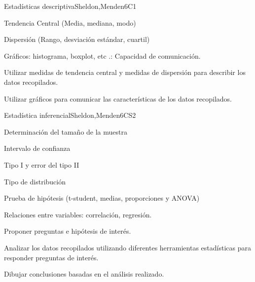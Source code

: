 \begin{syllabus}
\begin{unit}{Estadísticas descriptiva}{}{Sheldon,Menden}{6}{C1}
\begin{topics}
      \item Tendencia Central (Media, mediana, modo)
      \item Dispersión (Rango, desviación estándar, cuartil)
      \item Gráficos: histograma, boxplot, etc .: Capacidad de comunicación.
   \end{topics}
   \begin{learningoutcomes}
      \item Utilizar medidas de tendencia central y medidas de dispersión para describir los datos recopilados.
      \item Utilizar gráficos para comunicar las características de los datos recopilados.
   \end{learningoutcomes}
\end{unit}

\begin{unit}{Estadística inferencial}{}{Sheldon,Menden}{6}{CS2}
\begin{topics}
      \item Determinación del tamaño de la muestra
      \item Intervalo de confianza
      \item Tipo I y error del tipo II
      \item Tipo de distribución
      \item Prueba de hipótesis (t-student, medias, proporciones y ANOVA)
      \item Relaciones entre variables: correlación, regresión.
   \end{topics}

   \begin{learningoutcomes}
      \item Proponer preguntas e hipótesis de interés.
      \item Analizar los datos recopilados utilizando diferentes herramientas estadísticas para responder preguntas de interés.
      \item Dibujar conclusiones basadas en el análisis realizado.
   \end{learningoutcomes}
\end{unit}





\begin{coursebibliography}
\end{coursebibliography}

\end{syllabus}
